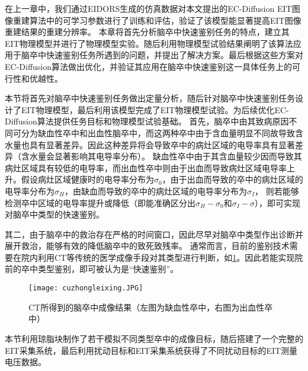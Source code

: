 

在上一章中，我们通过EIDORS生成的仿真数据对本文提出的EC-Diffusion EIT图像重建算法中的可学习参数进行了训练和评估，验证了该模型能显著提高EIT图像重建结果的重建分辨率。
本章将首先分析脑卒中快速鉴别任务的特点，建立其EIT物理模型并进行了物理模型实验。随后利用物理模型试验结果阐明了该算法应用于脑卒中快速鉴别任务所遇到的问题，并提出了解决方案。最后根据这些方案对EC-Diffusion算法做出优化，并验证其应用在脑卒中快速鉴别这一具体任务上的可行性和优越性。




本节将首先对脑卒中快速鉴别任务做出定量分析，随后针对脑卒中快速鉴别任务设计了EIT物理模型，最后利用该模型完成了EIT物理模型试验。为后续优化EC-Diffusion算法提供任务目标和物理模型试验基础。
首先，脑卒中由其致病原因不同可分为缺血性卒中和出血性脑卒中，而这两种卒中由于含血量明显不同故导致含水量也具有显著差异。因此这种差异将会导致卒中的病灶区域的电导率具有显著差异（含水量会显著影响其电导率分布）。
缺血性卒中由于其含血量较少因而导致其病灶区域具有较低的电导率，而出血性卒中则由于出血而导致病灶区域电导率上升。假设病灶区域健康时的电导率分布为$\sigma_0$，由于出血而导致的卒中的病灶区域的电导率分布为$\sigma_H$，由缺血而导致的卒中的病灶区域的电导率分布为$\sigma_I$，
则若能够检测卒中区域的电导率提升或降低（即能准确区分出$\sigma_H - \sigma_0$和$\sigma_I - \sigma$），即可实现对脑卒中类型的快速鉴别。

其二，由于脑卒中的救治存在严格的时间窗口，因此尽早对脑卒中类型作出诊断并展开救治，能够有效的降低脑卒中的致死致残率。
通常而言，目前的鉴别技术需要在院内利用CT等传统的医学成像手段对其类型进行判断，如\cref{figure:cuzhongleixing}。因此若能实现院前的卒中类型鉴别，即可被认为是“快速鉴别”。
\begin{figure}[H]
    \centering
    \texttt{[image: cuzhongleixing.JPG]}
    \caption{CT所得到的脑卒中成像结果（左图为缺血性卒中，右图为出血性卒中）}
    \label{figure:cuzhongleixing}
\end{figure}


本节利用琼脂块制作了若干模拟不同类型卒中的成像目标，随后搭建了一个完整的EIT采集系统，最后利用扰动目标和EIT采集系统获得了不同扰动目标的EIT测量电压数据。

